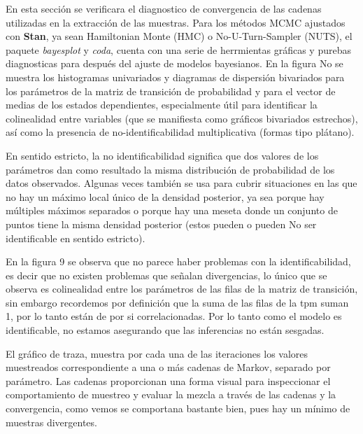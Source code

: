 \documentclass[a4paper]{article}\usepackage[]{graphicx}\usepackage[]{color}
\begin{document}
En esta sección se verificara el diagnostico de convergencia de las cadenas utilizadas en la extracción de las muestras. Para los métodos MCMC ajustados con \textbf{Stan}, ya sean Hamiltonian Monte (HMC) o No-U-Turn-Sampler (NUTS), el paquete \emph{bayesplot} y \emph{coda}, cuenta con una serie de herrmientas gráficas y purebas diagnosticas para después del ajuste de modelos bayesianos. En la figura No se muestra los histogramas univariados y diagramas de dispersión bivariados para los parámetros de la matriz de transición de probabilidad y para el vector de medias de los estados dependientes, especialmente útil para identificar la colinealidad entre variables (que se manifiesta como gráficos bivariados estrechos), así como la presencia de no-identificabilidad multiplicativa (formas tipo plátano).

En sentido estricto, la no identificabilidad significa que dos valores de los parámetros dan como resultado la misma distribución de probabilidad de los datos observados. Algunas veces también se usa para cubrir situaciones en las que no hay un máximo local único de la densidad posterior, ya sea porque hay múltiples máximos separados o porque hay una meseta donde un conjunto de puntos tiene la misma densidad posterior (estos pueden o pueden No ser identificable en sentido estricto).

En la figura 9 se observa que no parece haber problemas con la identificabilidad, es decir que no existen problemas que señalan divergencias, lo único que se observa es colinealidad entre los parámetros de las filas de la matriz de transición, sin embargo recordemos por definición que la suma de las filas de la tpm suman 1, por lo tanto están de por si correlacionadas. Por lo tanto como el modelo es identificable, no estamos asegurando que las inferencias no están sesgadas.

\vspace{5mm} %

El gráfico de traza, muestra por cada una de las iteraciones los valores muestreados correspondiente a una o más cadenas de Markov, separado por parámetro. Las cadenas proporcionan una forma visual para inspeccionar el comportamiento de muestreo y evaluar la mezcla a través de las cadenas y la convergencia, como vemos se comportana bastante bien, pues hay un mínimo de muestras divergentes.
\end{document}
